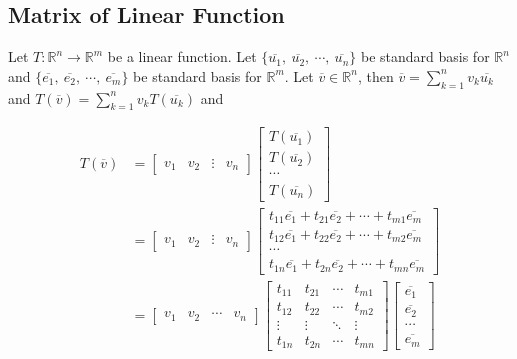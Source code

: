 \subsection{Matrix of Linear Function}
	Let $T : \mathbb{R}^n \to \mathbb{R}^m$ be a linear function. Let $\{\overline{u_1},\ \overline{u_2},\ \cdots,\ \overline{u_n}\}$ be standard basis for $\mathbb{R}^n$ and  $\{\overline{e_1},\ \overline{e_2},\ \cdots,\ \overline{e_m}\}$ be standard basis for $\mathbb{R}^m$. Let $\overline{v} \in \mathbb{R}^n$, then $\overline{v} = \sum_{k=1}^n v_k\overline{u_k}$ and $T(\overline{v}) = \sum_{k=1}^n v_k T(\overline{u_k})$ and
\begin{commentary}
\begin{align*}
	T(\overline{v}) & =  \begin{bmatrix} v_1 & v_2 & \vdots & v_n  \end{bmatrix} \begin{bmatrix} T(\overline{u_1}) \\ T(\overline{u_2}) \\ \cdots \\ T(\overline{u_n}) \end{bmatrix} \\
	& =  \begin{bmatrix} v_1 & v_2 & \vdots & v_n  \end{bmatrix}\begin{bmatrix} t_{11}\overline{e_1}+t_{21}\overline{e_2}+\cdots+t_{m1}\overline{e_m} \\ t_{12}\overline{e_1}+t_{22}\overline{e_2}+\cdots+t_{m2}\overline{e_m} \\ \cdots \\ t_{1n}\overline{e_1}+t_{2n}\overline{e_2}+\cdots+t_{mn}\overline{e_m} \end{bmatrix} \\
	& = \begin{bmatrix} v_1 & v_2 & \cdots & v_n  \end{bmatrix} \begin{bmatrix} t_{11} & t_{21} & \cdots & t_{m1} \\ t_{12} & t_{22} & \cdots & t_{m2} \\ \vdots & \vdots & \ddots & \vdots \\ t_{1n} & t_{2n} & \cdots & t_{mn} \end{bmatrix} \begin{bmatrix} \overline{e_1} \\ \overline{e_2} \\ \cdots \\ \overline{e_m} \end{bmatrix} \\

\end{align*}
\end{commentary}
